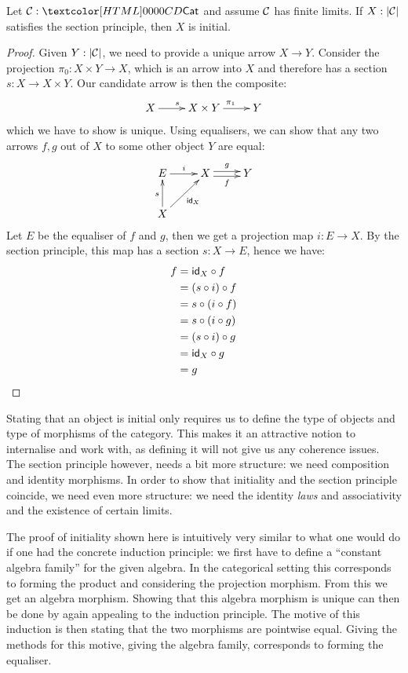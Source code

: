 \begin{lemma}
  \label{section-to-initiality}
  Let $\Cc: \Cat$ and assume $\mathcal{C}$ has finite limits. If $X : | \mathcal{C} |$
  satisfies the section principle, then $X$ is initial.
\end{lemma}
\begin{proof}
  Given $Y : |\mathcal{C}|$, we need to provide a unique arrow $X \to
  Y$. Consider the projection $\pi_0 : X \times Y \to X$, which is an
  arrow into $X$ and therefore has a section $s : X \to X \times
  Y$. Our candidate arrow is then the composite:
  $$
  \xymatrix{
    X \ar[r]^{s} &X \times Y \ar[r]^{\pi_1} &Y
  }
  $$
  which we have to show is unique. Using equalisers, we can show that
  any two arrows $f,g$ out of $X$ to some other object $Y$ are equal:
  \[
    \xymatrix{
      E \ar[r]^{i} &X \ar@<-.5ex>[r]_-{f} \ar@<.5ex>[r]^-{g} &Y \\
      X \ar[u]^{s} \ar[ur]_{\id_{X}}
    }
  \]
  Let $E$ be the equaliser of $f$ and $g$, then we get a projection map
  $i : E \to X$. By the section principle, this map has a section
  $s : X \to E$, hence we have:
  \begin{align*}
    f &= \mathsf{id}_X \circ f \\
      &= (s \circ i) \circ f \\
      &= s \circ (i \circ f) \\
      &= s \circ (i \circ g) \\
      &= (s \circ i) \circ g \\
      &= \mathsf{id}_X \circ g \\
      &= g
  \end{align*}
\end{proof}

Stating that an object is initial only requires us to define the type
of objects and type of morphisms of the category. This makes it an
attractive notion to internalise and work with, as defining it will
not give us any coherence issues. The section principle however, needs
a bit more structure: we need composition and identity morphisms. In
order to show that initiality and the section principle coincide, we
need even more structure: we need the identity \emph{laws} and
associativity and the existence of certain limits.

The proof of initiality shown here is intuitively very similar to what
one would do if one had the concrete induction principle: we first
have to define a ``constant algebra family'' for the given algebra. In
the categorical setting this corresponds to forming the product and
considering the projection morphism. From this we get an algebra
morphism. Showing that this algebra morphism is unique can then be
done by again appealing to the induction principle. The motive of this
induction is then stating that the two morphisms are pointwise
equal. Giving the methods for this motive, \ie giving the algebra
family, corresponds to forming the equaliser.

